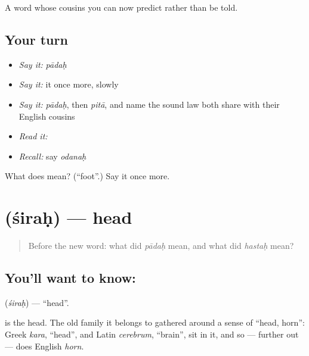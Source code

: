 \begin{grammarlens}[title={What you've built}]
A word whose cousins you can now predict rather than be told.
\end{grammarlens}

\subsection*{Your turn}
\begin{itemize}
\raggedright
  \item \emph{Say it:} \emph{pādaḥ}
  \item \emph{Say it:} it once more, slowly
  \item \emph{Say it:} \emph{pādaḥ}, then \emph{pitā}, and name the sound law both share with their English cousins
  \item \emph{Read it:} \textbf{}
  \item \emph{Recall:} say \emph{odanaḥ}
\end{itemize}

\begin{tcolorbox}[breakable,colback=teal!4,colframe=teal!35!black,title={Before you move on}]
What does  mean? (\textquotedblleft{}foot\textquotedblright{}.) Say it once more.
\end{tcolorbox}
\section[\texorpdfstring{\sk{शिरः} (śiraḥ)}{शिरः (śiraḥ)}]{ (śiraḥ) — head}

\label{lesson:SA-C25-head}



\begin{quote}
Before the new word: what did \emph{pādaḥ} mean, and what did \emph{hastaḥ} mean?
\end{quote}

\subsection*{You'll want to know: }
\textbf{} (\emph{śiraḥ}) — \textquotedblleft{}head\textquotedblright{}.

\textbf{} is the head. The old family it belongs to gathered around a sense of \textquotedblleft{}head, horn\textquotedblright{}: Greek \emph{kara}, \textquotedblleft{}head\textquotedblright{}, and Latin \emph{cerebrum}, \textquotedblleft{}brain\textquotedblright{}, sit in it, and so — further out — does English \emph{horn}.

